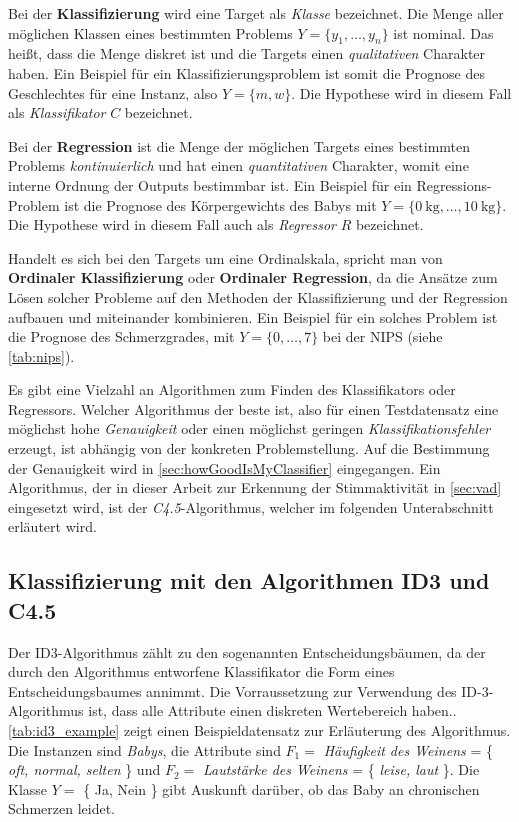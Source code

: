 Bei der \textbf{Klassifizierung} wird eine Target als \emph{Klasse} bezeichnet. Die Menge aller möglichen Klassen eines bestimmten Problems $Y = \{ y_1 , \ldots, y_n\}$ ist nominal. Das heißt, dass die Menge diskret ist und die Targets einen \emph{qualitativen} Charakter haben. Ein Beispiel für ein Klassifizierungsproblem ist somit die Prognose des Geschlechtes für eine Instanz, also $Y = \{m, w\}$. Die Hypothese wird in diesem Fall als \emph{Klassifikator} $C$ bezeichnet.

Bei der \textbf{Regression} ist die Menge der möglichen Targets eines bestimmten Problems \emph{kontinuierlich} und hat einen \emph{quantitativen} Charakter, womit eine interne Ordnung der Outputs bestimmbar ist. Ein Beispiel für ein Regressions-Problem ist die Prognose des Körpergewichts des Babys mit $Y = \{ \SI{0}{\kilo\gram} , \ldots , \SI{10}{\kilo\gram} \}$. Die Hypothese wird in diesem Fall auch als \emph{Regressor} $R$ bezeichnet.\cite[S. 24]{learning_cart_dobra} \cite[S. 8]{machine_marsland} \cite[S. 28]{statistical_learning}

Handelt es sich bei den Targets um eine Ordinalskala, spricht man von \textbf{Ordinaler Klassifizierung} oder \textbf{Ordinaler Regression}, da die Ansätze zum Lösen solcher Probleme auf den Methoden der Klassifizierung und der Regression aufbauen und miteinander kombinieren.\cite[S. 1]{ordinalClassification} Ein Beispiel für ein solches Problem ist die Prognose des Schmerzgrades, mit $Y = \{ 0 , \ldots, 7  \}$ bei der NIPS (siehe \autoref{tab:nips}).

Es gibt eine Vielzahl an Algorithmen zum Finden des Klassifikators oder Regressors. Welcher Algorithmus der \glqq beste\grqq{} ist, also für einen Testdatensatz eine möglichst hohe \emph{Genauigkeit} oder einen möglichst geringen \emph{Klassifikationsfehler} erzeugt, ist abhängig von der konkreten Problemstellung. Auf die Bestimmung der Genauigkeit wird in \autoref{sec:howGoodIsMyClassifier} eingegangen. Ein Algorithmus, der in dieser Arbeit zur Erkennung der Stimmaktivität in \autoref{sec:vad} eingesetzt wird, ist der \emph{C4.5}-Algorithmus, welcher im folgenden Unterabschnitt erläutert wird.

\subsection{Klassifizierung mit den Algorithmen ID3 und C4.5}
\label{sec:id3}

Der ID3-Algorithmus zählt zu den sogenannten Entscheidungsbäumen, da der durch den Algorithmus entworfene Klassifikator die Form eines Entscheidungsbaumes annimmt. Die Vorraussetzung zur Verwendung des ID-3-Algorithmus ist, dass alle Attribute einen diskreten Wertebereich haben.\cite[S. 54]{machine_mitchell}. \autoref{tab:id3_example} zeigt einen Beispieldatensatz zur Erläuterung des Algorithmus. Die Instanzen sind \emph{Babys}, die Attribute sind $F_1 = $ \emph{Häufigkeit des Weinens} = \{ \emph{oft, normal, selten} \} und $F_2 = $ \emph{Lautstärke des Weinens} = \{ \emph{leise, laut} \}. Die Klasse $Y = $ \{ Ja, Nein \} gibt Auskunft darüber, ob das Baby an chronischen Schmerzen leidet. 

